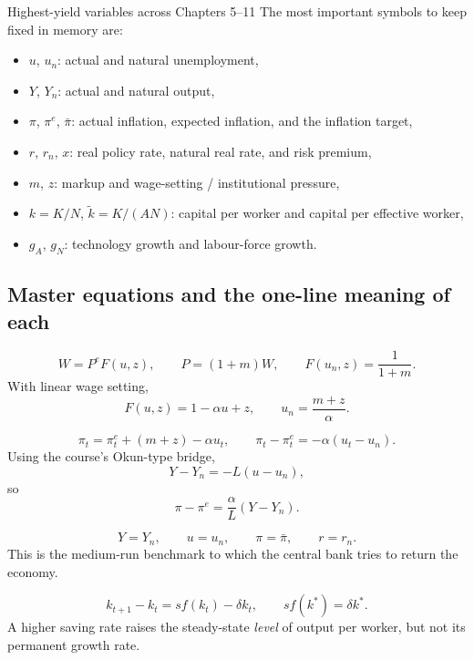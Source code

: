 \documentclass[12pt]{article}
\begin{document}
\begin{definition}{Highest-yield variables across Chapters 5--11}{}
The most important symbols to keep fixed in memory are:
\begin{itemize}[leftmargin=1.5em]
\item \(u\), \(u_n\): actual and natural unemployment,
\item \(Y\), \(Y_n\): actual and natural output,
\item \(\pi\), \(\pi^e\), \(\bar{\pi}\): actual inflation, expected inflation, and the inflation target,
\item \(r\), \(r_n\), \(x\): real policy rate, natural real rate, and risk premium,
\item \(m\), \(z\): markup and wage-setting / institutional pressure,
\item \(k=K/N\), \(\tilde{k}=K/(AN)\): capital per worker and capital per effective worker,
\item \(g_A\), \(g_N\): technology growth and labour-force growth.
\end{itemize}
\end{definition}

\subsection{Master equations and the one-line meaning of each}

\begin{keyformula}[title={Key Formula: Labour market and natural rate}]
\[
W=P^eF(u,z),
\qquad
P=(1+m)W,
\qquad
F(u_n,z)=\frac{1}{1+m}.
\]
With linear wage setting,
\[
F(u,z)=1-\alpha u+z,
\qquad
u_n=\frac{m+z}{\alpha}.
\]
\end{keyformula}

\begin{keyformula}[title={Key Formula: Phillips curve forms}]
\[
\pi_t=\pi_t^e+(m+z)-\alpha u_t,
\qquad
\pi_t-\pi_t^e=-\alpha(u_t-u_n).
\]
Using the course's Okun-type bridge,
\[
Y-Y_n=-L(u-u_n),
\]
so
\[
\pi-\pi^e=\frac{\alpha}{L}(Y-Y_n).
\]
\end{keyformula}

\begin{keyformula}[title={Key Formula: Medium-run IS--LM--PC equilibrium}]
\[
Y=Y_n,\qquad u=u_n,\qquad \pi=\bar{\pi},\qquad r=r_n.
\]
This is the medium-run benchmark to which the central bank tries to return the economy.
\end{keyformula}

\begin{keyformula}[title={Key Formula: Solow without technology}]
\[
k_{t+1}-k_t=s f(k_t)-\delta k_t,
\qquad
s f(k^*)=\delta k^*.
\]
A higher saving rate raises the steady-state \emph{level} of output per worker, but not its permanent growth rate.
\end{keyformula}
\end{document}
